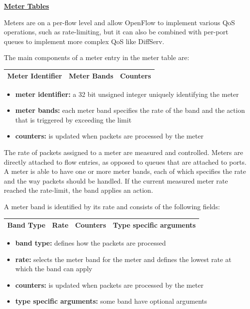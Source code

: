 \underline{\textbf{Meter Tables}}

Meters are on a per-flow level and allow OpenFlow to implement various QoS operations, such as rate-limiting, but it can also be combined with per-port queues to implement more complex QoS like DiffServ.

The main components of a meter entry in the meter table are:

\begin{center}
\begin{tabular}{|c|c|c|}
\hline Meter Identifier & Meter Bands & Counters \\ 
\hline 
\end{tabular} 
\end{center}

\begin{itemize}
\item \textbf{meter identifier:} a 32 bit unsigned integer uniquely identifying the meter
\item \textbf{meter bands:} each meter band specifies the rate of the band and the action that is triggered by exceeding the limit
\item \textbf{counters:} is updated when packets are processed by the meter
\end{itemize}

The rate of packets assigned to a meter are measured and controlled. Meters are directly attached to flow entries, as opposed to queues that are attached to ports. A meter is able to have one or more meter bands, each of which specifies the rate and the way packets should be handled. If the current measured meter rate reached the rate-limit, the band applies an action. 

A meter band is identified by its rate and consists of the following fields:

\begin{center}
\begin{tabular}{|c|c|c|c|}
\hline Band Type & Rate & Counters & Type specific arguments \\ 
\hline 
\end{tabular} 
\end{center}

\begin{itemize}
\item \textbf{band type:} defines how the packets are processed
\item \textbf{rate:} selects the meter band for the meter and defines the lowest rate at which the band can apply
\item \textbf{counters:} is updated when packets are processed by the meter
\item \textbf{type specific arguments:} some band have optional arguments
\end{itemize}

